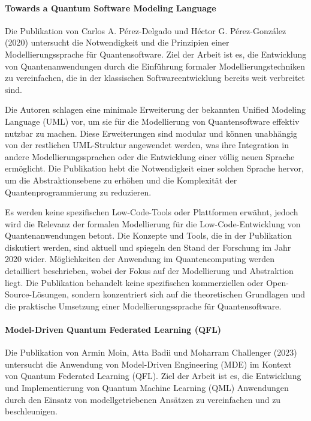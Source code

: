 \paragraph{Towards a Quantum Software Modeling Language}

Die Publikation von Carlos A. Pérez-Delgado und Héctor G. Pérez-González (2020) untersucht die Notwendigkeit und die 
Prinzipien einer Modellierungssprache für Quantensoftware. Ziel der Arbeit ist es, die Entwicklung von 
Quantenanwendungen durch die Einführung formaler Modellierungstechniken zu vereinfachen, die in der 
klassischen Softwareentwicklung bereits weit verbreitet sind.

Die Autoren schlagen eine minimale Erweiterung der bekannten Unified Modeling Language (UML) vor, um sie für die 
Modellierung von Quantensoftware effektiv nutzbar zu machen. Diese Erweiterungen sind modular und können unabhängig 
von der restlichen UML-Struktur angewendet werden, was ihre Integration in andere Modellierungssprachen 
oder die Entwicklung einer völlig neuen Sprache ermöglicht. Die Publikation hebt die Notwendigkeit einer solchen Sprache 
hervor, um die Abstraktionsebene zu erhöhen und die Komplexität der Quantenprogrammierung zu reduzieren.

Es werden keine spezifischen Low-Code-Tools oder Plattformen erwähnt, jedoch wird die Relevanz der 
formalen Modellierung für die Low-Code-Entwicklung von Quantenanwendungen betont. 
Die Konzepte und Tools, die in der Publikation diskutiert werden, sind aktuell und spiegeln den Stand der Forschung im Jahr 2020 wider. 
Möglichkeiten der Anwendung im Quantencomputing werden detailliert beschrieben, wobei der Fokus auf der Modellierung 
und Abstraktion liegt. Die Publikation behandelt keine spezifischen kommerziellen oder Open-Source-Lösungen, sondern 
konzentriert sich auf die theoretischen Grundlagen und die praktische Umsetzung einer Modellierungssprache für Quantensoftware.

\paragraph{Model-Driven Quantum Federated Learning (QFL)}

Die Publikation von Armin Moin, Atta Badii und Moharram Challenger (2023) untersucht die Anwendung von 
Model-Driven Engineering (MDE) im Kontext von Quantum Federated Learning (QFL). Ziel der Arbeit ist es, die Entwicklung und 
Implementierung von Quantum Machine Learning (QML) Anwendungen durch den Einsatz von modellgetriebenen Ansätzen zu vereinfachen und zu beschleunigen.

